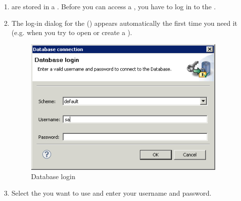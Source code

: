 \begin{enumerate}
\item \gdprojects{} are stored in  a \gddb{}. Before you can access a \gdproject{}, you have to log in to the \gddb{}. 
\item The log-in dialog for the \gddb{} () appears automatically the first time you need it (e.g. when you try to open or create a \gdproject{}). 

\begin{figure}[h]
\begin{center}
\includegraphics[width=10cm]{Tasks/Database/PS/dblogin}
\caption{Database login}
\label{dblogin}
\end{center}
\end{figure}


\item Select the \gddb{} you want to use and enter your username and password.

\end{enumerate}

